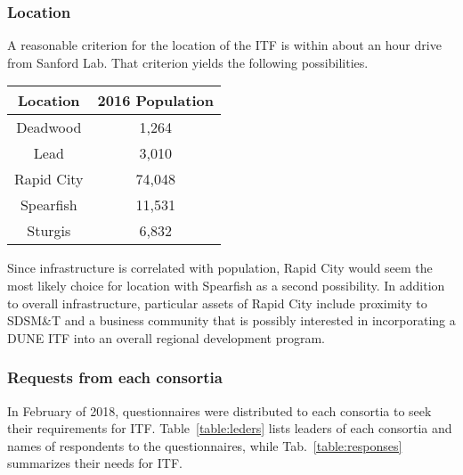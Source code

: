 \subsubsection{Location }
A reasonable criterion for the location of the ITF is within about an
hour drive from Sanford Lab. That criterion yields the following
possibilities.
\begin{center}
\begin{tabular}{ |c|c| } \hline
{\bf Location} & {\bf 2016 Population}  \\ \hline 
Deadwood & 1,264  \\ 
Lead & 3,010  \\
Rapid City & 74,048  \\
Spearfish & 11,531  \\
Sturgis & 6,832  \\ \hline
\end{tabular}
\end{center}
Since infrastructure is correlated with population, Rapid City would seem the most likely
choice for location with Spearfish as a second possibility. In addition to overall infrastructure,
particular assets of Rapid City include proximity to SDSM\&T and a business community that is
possibly interested in incorporating a DUNE ITF into an overall regional development
program.

\subsubsection{\bf Requests from each consortia} 
In February of 2018, questionnaires were distributed to each consortia to seek
their requirements for ITF. Table~\ref{table:leders} lists leaders of each consortia
and names of respondents to the questionnaires, while Tab.~\ref{table:responses}
summarizes their needs for ITF.
 

